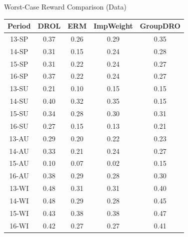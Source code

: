 \documentclass{beamer}
\begin{document}
\begin{frame}{Worst-Case Reward Comparison (Data)}
    \begin{table}[h]
        \centering
        \begin{tabular}{c|c|c|c|c}
            \textbf{Period} & \textbf{DROL} & \textbf{ERM} & \textbf{ImpWeight} & \textbf{GroupDRO} \\
            \hline
            13-SP  & 0.37  & 0.26  & 0.29      & 0.35     \\
            14-SP  & 0.31  & 0.15  & 0.24      & 0.28     \\
            15-SP  & 0.31  & 0.22  & 0.24      & 0.27     \\
            16-SP  & 0.37  & 0.22  & 0.24      & 0.27     \\
            13-SU  & 0.21  & 0.10  & 0.15      & 0.15     \\
            14-SU  & 0.40  & 0.32  & 0.35      & 0.15     \\
            15-SU  & 0.34  & 0.28  & 0.30      & 0.31     \\
            16-SU  & 0.27  & 0.15  & 0.13      & 0.21     \\
            13-AU  & 0.29  & 0.20  & 0.22      & 0.23     \\
            14-AU  & 0.33  & 0.21  & 0.24      & 0.27     \\
            15-AU  & 0.10  & 0.07  & 0.02      & 0.15     \\
            16-AU  & 0.38  & 0.29  & 0.28      & 0.30     \\
            13-WI  & 0.48  & 0.31  & 0.31      & 0.40     \\
            14-WI  & 0.48  & 0.29  & 0.28      & 0.45     \\
            15-WI  & 0.43  & 0.38  & 0.38      & 0.47     \\
            16-WI  & 0.42  & 0.27  & 0.27      & 0.41     \\
        \end{tabular}
    \end{table}
\end{frame}
\end{document}

